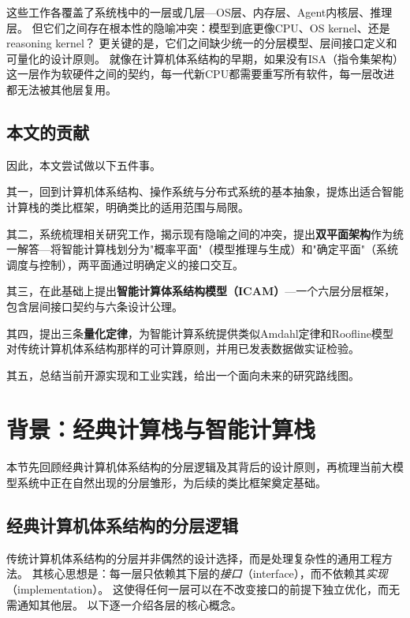 这些工作各覆盖了系统栈中的一层或几层---OS层、内存层、Agent内核层、推理层。
但它们之间存在根本性的隐喻冲突：模型到底更像CPU、OS kernel、还是reasoning kernel？
更关键的是，它们之间缺少统一的分层模型、层间接口定义和可量化的设计原则。
就像在计算机体系结构的早期，如果没有ISA（指令集架构）这一层作为软硬件之间的契约，每一代新CPU都需要重写所有软件，每一层改进都无法被其他层复用。

\subsection{本文的贡献}

因此，本文尝试做以下五件事。

其一，回到计算机体系结构、操作系统与分布式系统的基本抽象，提炼出适合智能计算栈的类比框架，明确类比的适用范围与局限。

其二，系统梳理相关研究工作，揭示现有隐喻之间的冲突，提出\textbf{双平面架构}作为统一解答---将智能计算栈划分为"概率平面"（模型推理与生成）和"确定平面"（系统调度与控制），两平面通过明确定义的接口交互。

其三，在此基础上提出\textbf{智能计算体系结构模型（ICAM）}---一个六层分层框架，包含层间接口契约与六条设计公理。

其四，提出三条\textbf{量化定律}，为智能计算系统提供类似Amdahl定律和Roofline模型对传统计算机体系结构那样的可计算原则，并用已发表数据做实证检验。

其五，总结当前开源实现和工业实践，给出一个面向未来的研究路线图。

\section{背景：经典计算栈与智能计算栈}
\label{sec:background}

本节先回顾经典计算机体系结构的分层逻辑及其背后的设计原则，再梳理当前大模型系统中正在自然出现的分层雏形，为后续的类比框架奠定基础。

\subsection{经典计算机体系结构的分层逻辑}

传统计算机体系结构的分层并非偶然的设计选择，而是处理复杂性的通用工程方法\cite{hennessy2017quantitative}。
其核心思想是：每一层只依赖其下层的\emph{接口}（interface），而不依赖其\emph{实现}（implementation）。
这使得任何一层可以在不改变接口的前提下独立优化，而无需通知其他层。
以下逐一介绍各层的核心概念。

